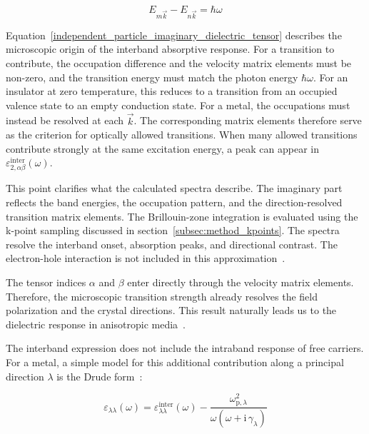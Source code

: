 \begin{equation}
    E_{m\vec{k}}-E_{n\vec{k}}=\hbar\omega
\label{dirac_energy_conservation_condition}
\end{equation}

Equation~\eqref{independent_particle_imaginary_dielectric_tensor} describes the microscopic origin of the interband absorptive response.
For a transition to contribute, the occupation difference and the velocity matrix elements must be non-zero,
and the transition energy must match the photon energy $\hbar\omega$.
For an insulator at zero temperature, this reduces to a transition from an occupied valence state to an empty conduction state.
For a metal, the occupations must instead be resolved at each $\vec{k}$.
The corresponding matrix elements therefore serve as the criterion for optically allowed transitions.
When many allowed transitions contribute strongly at the same excitation energy,
a peak can appear in $\varepsilon_{2,\alpha\beta}^{\mathrm{inter}}(\omega)$.

This point clarifies what the calculated spectra describe.
The imaginary part reflects the band energies, the occupation pattern,
and the direction-resolved transition matrix elements.
The Brillouin-zone integration is evaluated using the k-point sampling discussed in section~\ref{subsec:method_kpoints}.
The spectra resolve the interband onset, absorption peaks, and directional contrast.
The electron-hole interaction is not included in this approximation~\cite{wang2018colloquium,yao2026propagation}.

The tensor indices $\alpha$ and $\beta$ enter directly through the velocity matrix elements.
Therefore, the microscopic transition strength already resolves the field polarization and the crystal directions.
This result naturally leads us to the dielectric response in anisotropic media~\cite{huang2023optical}.

The interband expression does not include the intraband response of free carriers.
For a metal, a simple model for this additional contribution along a principal direction $\lambda$ is the Drude form~\cite{dressel2002electrodynamics}:

\begin{equation}
    \varepsilon_{\lambda\lambda}(\omega)
    = \varepsilon_{\lambda\lambda}^{\mathrm{inter}}(\omega)
    - \frac{\omega_{\mathrm{p},\lambda}^{2}}
    {\omega\left(\omega+\mathrm{i}\,\gamma_{\lambda}\right)}
\label{interband_and_drude_dielectric_response}
\end{equation}


